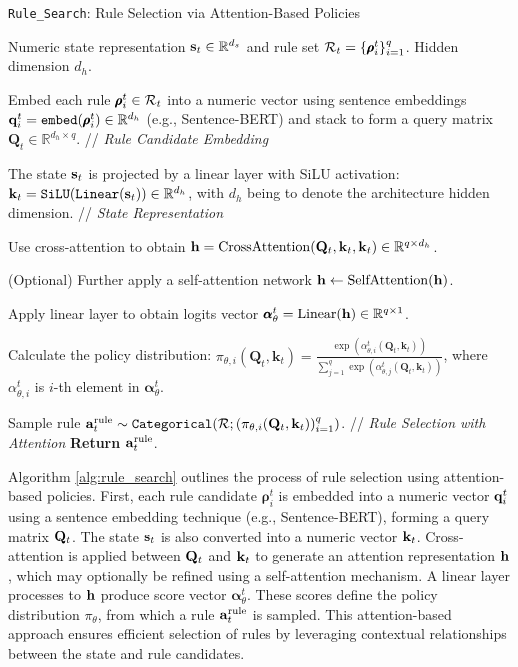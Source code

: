 \begin{algorithm}[H]
\caption{\texttt{Rule\_Search}: Rule Selection via Attention-Based Policies}
\begin{algorithmic}[1]
\REQUIRE Numeric state representation ${\mathbf{s}}_t \in \mathbb{R}^{d_s}$  and rule set ${\mathcal{R}}_t=\{\pmb{\rho}^t_{i}\}_{i=1}^q$. Hidden dimension $d_h$.

\STATE Embed each rule \( \pmb{\rho}^t_{i} \in {\mathcal{R}}_t \) into a numeric vector using sentence embeddings ${\mathbf{q}}^t_i=\texttt{embed}(\pmb{\rho}^t_i)\in\mathbb{R}^{d_h}$ (e.g., Sentence-BERT) and stack to form a query matrix \( \mathbf{Q}_t \in \mathbb{R}^{d_h \times q} \). {// \textit{Rule Candidate Embedding}}

\STATE The state ${\mathbf{s}}_t$ is projected by a linear layer with SiLU activation: $\mathbf{k}_t =\texttt{SiLU}(\texttt{Linear}({\mathbf{s}}_t)) \in \mathbb{R}^{d_h}$, with $d_h$ being to denote the architecture hidden dimension. { // \textit{State Representation}}


\STATE Use cross-attention to obtain $\mathbf{h}=\mathrm{CrossAttention}(\mathbf{Q}_t, \mathbf{k}_t, \mathbf{k}_t)\in \mathbb{R}^{q \times d_h}$.

\STATE (Optional) Further apply a self-attention network $\mathbf{h} \leftarrow \mathrm{SelfAttention}(\mathbf{h})$.

\STATE Apply linear layer to obtain logits vector $\pmb{\alpha}_{\theta}^t=\mathrm{Linear}(\mathbf{h}) \in \mathbb{R}^{q \times 1}$.

\STATE Calculate the policy distribution:
$\pi_{\theta, i}(\mathbf{Q}_t,\mathbf{k}_t) = \frac{\exp(\alpha^t_{\theta, i}(\mathbf{Q}_t,\mathbf{k}_t))}{\sum_{j=1}^q \exp(\alpha^t_{\theta, j}(\mathbf{Q}_t,\mathbf{k}_t))}$, where $\alpha^t_{\theta, i}$ is $i$-th element in $\pmb{\alpha}_{\theta}^t$.

\STATE Sample rule ${\mathbf{a}}^{\text{rule}}_t \sim \texttt{Categorical}({\mathcal{R}}; (\pi_{\theta,i}(\mathbf{Q}_t, \mathbf{k}_t))_{i=1}^q)$. {// \textit{Rule Selection with Attention}}
\STATE \textbf{Return} ${\mathbf{a}}^{\text{rule}}_t$.
\label{alg:rule_search}
\end{algorithmic}
\end{algorithm}

Algorithm \ref{alg:rule_search} outlines the process of rule selection using attention-based policies.   First, each rule candidate $\pmb{\rho}_i^t$ is embedded into a numeric vector ${\mathbf{q}}_i^t$ using a sentence embedding technique (e.g., Sentence-BERT), forming a query matrix ${\mathbf{Q}}_t$. The state ${\mathbf{s}}_t$ is also converted into a numeric vector ${\mathbf{k}}_t$. Cross-attention is applied between ${\mathbf{Q}}_t$ and ${\mathbf{k}}_t$ to generate an attention representation  $\mathbf{h}$, which may optionally be refined using a self-attention mechanism. A linear layer processes to $\mathbf{h}$ produce score vector $\pmb{\alpha}_{\theta}^t$. These scores define the policy distribution $\pi_\theta$, from which a rule ${\mathbf{a}}^{\text{rule}}_t$
is sampled. This attention-based approach ensures efficient selection of rules by leveraging contextual relationships between the state and rule candidates.

